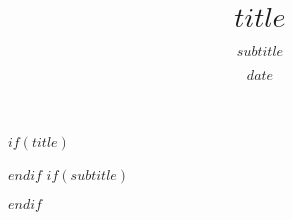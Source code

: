
\setlength{\TPHorizModule}{1cm}
\setlength{\TPVertModule}{1cm}

\def\placefig#1#2#3#4#5{
  \begin{textblock}{#3}(#1,#2)
    \rlap{\texttt{[image: \#5]}}
  \end{textblock}}

$if(title)$
\title{$title$}
$endif$
$if(subtitle)$
\subtitle{$subtitle$}
$endif$
\date{$date$}

\makeatletter
\def\cover{{\sffamily\setcounter{page}{0}

        \thispagestyle{empty}
        
        \placefig{14}{1.5}{5}{height=20cm,keepaspectratio}{$companylogo$}
        
        \vspace*{4.5cm}
        
        \begin{textblock}{14}(3,8.5) %
          \noindent
          \textsf{\textbf{\color[HTML]{0874bc}\fontsize{20pt}{28pt}\selectfont\expandafter{$title$}}}
        \end{textblock}

        \vspace*{3cm}

        \begin{center}
          \textsf{\color[HTML]{0874bc}\fontsize{16pt}{22pt}\selectfont\expandafter{$subtitle$}}
          \vspace*{4.5cm}
        \end{center}
        
        
        \begin{textblock}{4}(0,8) %
          \begingroup
          \color[HTML]{c36cc0}
          \rule{2cm}{1cm}
          \endgroup
        \end{textblock}
        
        \begin{textblock}{24}(0,25)
          \begingroup
          \color[HTML]{0874bc}
          \rule{24cm}{5cm}
          \endgroup
        \end{textblock}
        
}}
